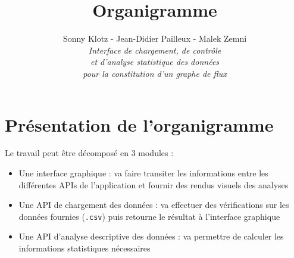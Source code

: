 
\usepackage{tikz}
\usepackage{inputenc}
\usetikzlibrary{arrows,automata}
\usetikzlibrary{positioning}
\geometry{top=3cm,bottom=3cm}

\title{\vspace{\fill}\textbf{\Huge Organigramme}}
\author{Sonny Klotz - Jean-Didier Pailleux - Malek Zemni\vspace{2em}\\\textit{Interface de chargement, de contrôle}\\\textit{et d’analyse statistique des données}\\\textit{pour la constitution d’un graphe de flux}\vspace{2em}}


\maketitle\vspace{\fill}
\newpage
	
	\section{Présentation de l'organigramme}
		Le travail peut être décomposé en 3 modules :
		\begin{itemize}
		\item Une interface graphique : va faire transiter les informations entre les différentes APIs de l'application et fournir des rendus visuels des analyses
		\item Une API de chargement des données : va effectuer des vérifications sur les données fournies (\lstinline!.csv!) puis retourne le résultat à l'interface graphique
		\item Une API d'analyse descriptive des données : va permettre de calculer les informations statistiques nécessaires
		\end{itemize}
		
